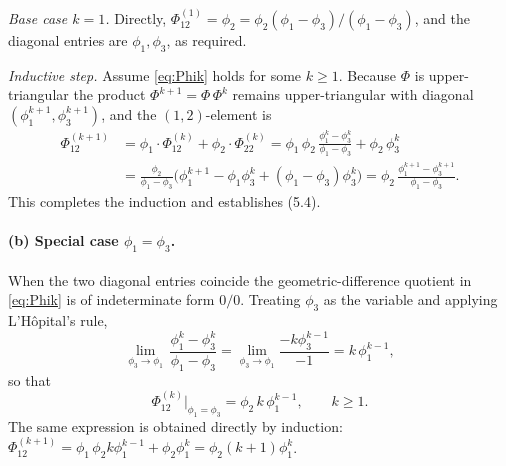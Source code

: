 \documentclass[12pt]{article}
\begin{document}
\textit{Base case $k=1$.} Directly, $\Phi^{(1)}_{12}=\phi_2=\phi_2(\phi_1-\phi_3)/(\phi_1-\phi_3)$, and the diagonal entries are $\phi_1,\phi_3$, as required.

\textit{Inductive step.} Assume \eqref{eq:Phik} holds for some $k\geq 1$. Because $\Phi$ is upper-triangular the product $\Phi^{k+1}=\Phi\,\Phi^{k}$ remains upper-triangular with diagonal $(\phi_1^{k+1},\phi_3^{k+1})$, and the $(1,2)$-element is
\begin{align*}
\Phi^{(k+1)}_{12} &= \phi_1\cdot\Phi^{(k)}_{12} + \phi_2\cdot\Phi^{(k)}_{22}
= \phi_1\,\phi_2\,\frac{\phi_1^{k}-\phi_3^{k}}{\phi_1-\phi_3} + \phi_2\,\phi_3^{k}\\
&= \frac{\phi_2}{\phi_1-\phi_3}\Big(\phi_1^{k+1}-\phi_1\phi_3^{k}+(\phi_1-\phi_3)\phi_3^{k}\Big)
= \phi_2\,\frac{\phi_1^{k+1}-\phi_3^{k+1}}{\phi_1-\phi_3}.
\end{align*}
This completes the induction and establishes (5.4).

\paragraph{(b) Special case $\phi_1=\phi_3$.} When the two diagonal entries coincide the geometric-difference quotient in \eqref{eq:Phik} is of indeterminate form $0/0$. Treating $\phi_3$ as the variable and applying L'H\^{o}pital's rule,
\begin{equation*}
\lim_{\phi_3\to\phi_1}\,\frac{\phi_1^{k}-\phi_3^{k}}{\phi_1-\phi_3}
= \lim_{\phi_3\to\phi_1}\frac{-k\phi_3^{k-1}}{-1}
= k\,\phi_1^{k-1},
\end{equation*}
so that
\begin{equation}
\Phi^{(k)}_{12}\bigg|_{\phi_1=\phi_3} = \phi_2\,k\,\phi_1^{k-1},\qquad k\geq 1.\label{eq:Phik-equal}
\end{equation}
The same expression is obtained directly by induction: $\Phi^{(k+1)}_{12}=\phi_1\,\phi_2 k\phi_1^{k-1}+\phi_2\phi_1^{k}=\phi_2(k+1)\phi_1^{k}$.
\end{document}
